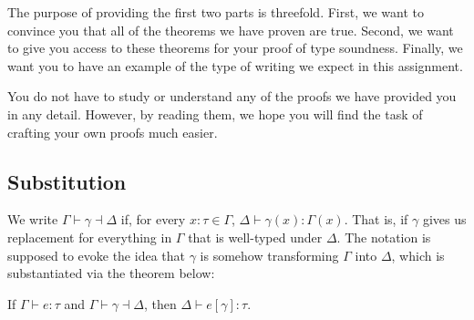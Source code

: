 \documentclass{homework}
\begin{document}
The purpose of providing the first two parts is threefold.
First, we want to convince you that all of the theorems we have proven are true.
Second, we want to give you access to these theorems for your proof of type soundness.
Finally, we want you to have an example of the type of writing we expect in this assignment.

You do not have to study or understand any of the proofs we have provided you in any detail.
However, by reading them, we hope you will find the task of crafting your own proofs much easier.

\subsection{Substitution}
We write $\Gamma \vdash \gamma \dashv \Delta$ if, for every $x : \tau \in \Gamma$, $\Delta \vdash \gamma(x) : \Gamma(x)$.
That is, if $\gamma$ gives us replacement for everything in $\Gamma$ that is well-typed under $\Delta$.
The notation is supposed to evoke the idea that $\gamma$ is somehow transforming $\Gamma$ into $\Delta$, which is substantiated via the theorem below:
\begin{thm}
  \label{thm:subst}
  If $\Gamma \vdash e : \tau$ and $\Gamma \vdash \gamma \dashv \Delta$, then $\Delta \vdash e[\gamma] : \tau$.
\end{thm}
\end{document}
